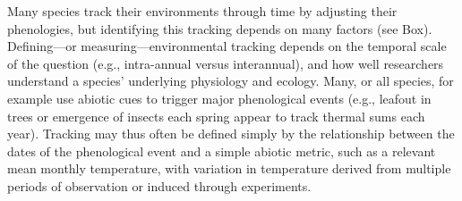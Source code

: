 \documentclass[11pt,letterpaper]{article}
\begin{document}
Many species track their environments through time by adjusting their phenologies, but identifying this tracking depends on many factors (see Box). Defining---or measuring---environmental tracking depends on the temporal scale of the question (e.g., intra-annual versus interannual), and how well researchers understand a species' underlying physiology and ecology. Many, or all species, for example use abiotic cues to trigger major phenological events (e.g., leafout in trees or emergence of insects each spring appear to track thermal sums each year). Tracking may thus often be defined simply by the relationship between the dates of the phenological event and a simple abiotic metric, such as a relevant mean monthly temperature, with variation in temperature derived from multiple periods of observation or induced through experiments. 
\end{document}
